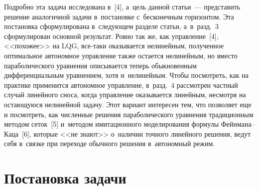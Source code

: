 \begin{multicols}{2}
Подробно эта задача 
исследована в~[4], а~цель данной статьи~--- пред\-ста\-вить решение 
аналогичной задачи в~постановке с~бесконечным горизонтом. Эта 
постановка сформулирована в~сле\-ду\-ющем разделе статьи, а~в~разд.~3 
сформулирован основной результат. Ровно так же, как управ\-ле\-ние~[4], 
<<похожее>> на LQG, все-та\-ки оказывается нелинейным, полученное 
оптимальное автономное управ\-ле\-ние также остается нелинейным, но 
вместо параболического урав\-не\-ния описывается теперь обыкновенным 
дифференциальным уравнением, хотя и~нелинейным. Чтобы посмотреть, как 
на практике применится автономное управ\-ле\-ние, в~разд.~4 рассмотрен 
част\-ный случай линейного сноса, когда управ\-ле\-ние оказывается линейным, 
несмотря на оста\-ющу\-юся нелинейной задачу. Этот вариант интересен тем, 
что поз\-во\-ля\-ет еще и посмотреть, как чис\-лен\-ные решения параболического 
уравнения традиционным методом сеток~[5] и~методом имитационного 
моделирования формулы Фейн\-ма\-на--Ка\-ца~[6], которые <<не знают>> 
о~наличии точного линейного решения, ведут себя в~связке при переходе 
обычного решения в~автономный режим.

\vspace*{-3pt}

\section{Постановка задачи}

\vspace*{-3pt}


\end{multicols}
